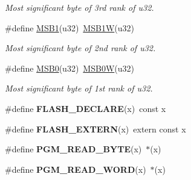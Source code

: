 \begin{DoxyCompactItemize}
\begin{DoxyCompactList}\small\item\em Most significant byte of 3rd rank of {\itshape u32}. \end{DoxyCompactList}\item 
\hypertarget{group__group__sam0__utils_ga3facab9f8ebf70ad6e16038465e2bedc}{}\#define \hyperlink{group__group__sam0__utils_ga3facab9f8ebf70ad6e16038465e2bedc}{M\+S\+B1}(u32)~\hyperlink{group__group__sam0__utils_ga0f90ecd0b0f0e15608a95b8367b77ece}{M\+S\+B1\+W}(u32)\label{group__group__sam0__utils_ga3facab9f8ebf70ad6e16038465e2bedc}

\begin{DoxyCompactList}\small\item\em Most significant byte of 2nd rank of {\itshape u32}. \end{DoxyCompactList}\item 
\hypertarget{group__group__sam0__utils_gafb81783b8186acd7182a971048b0c6b3}{}\#define \hyperlink{group__group__sam0__utils_gafb81783b8186acd7182a971048b0c6b3}{M\+S\+B0}(u32)~\hyperlink{group__group__sam0__utils_ga25110f05bdb5b5ea3fcb2854a1a07d7a}{M\+S\+B0\+W}(u32)\label{group__group__sam0__utils_gafb81783b8186acd7182a971048b0c6b3}

\begin{DoxyCompactList}\small\item\em Most significant byte of 1st rank of {\itshape u32}. \end{DoxyCompactList}\item 
\hypertarget{group__group__sam0__utils_ga9b84ecc6b34a71f797ceb8b8f7b8d384}{}\#define {\bfseries F\+L\+A\+S\+H\+\_\+\+D\+E\+C\+L\+A\+R\+E}(x)~const x\label{group__group__sam0__utils_ga9b84ecc6b34a71f797ceb8b8f7b8d384}

\item 
\hypertarget{group__group__sam0__utils_gaaef0fd990bb5bd9cdf11334f7c689fd7}{}\#define {\bfseries F\+L\+A\+S\+H\+\_\+\+E\+X\+T\+E\+R\+N}(x)~extern const x\label{group__group__sam0__utils_gaaef0fd990bb5bd9cdf11334f7c689fd7}

\item 
\hypertarget{group__group__sam0__utils_gafe9b83c73d4840986478ec67d3eb7718}{}\#define {\bfseries P\+G\+M\+\_\+\+R\+E\+A\+D\+\_\+\+B\+Y\+T\+E}(x)~$\ast$(x)\label{group__group__sam0__utils_gafe9b83c73d4840986478ec67d3eb7718}

\item 
\hypertarget{group__group__sam0__utils_ga92576bffe51090dcb6d5c67e07b9eec7}{}\#define {\bfseries P\+G\+M\+\_\+\+R\+E\+A\+D\+\_\+\+W\+O\+R\+D}(x)~$\ast$(x)\label{group__group__sam0__utils_ga92576bffe51090dcb6d5c67e07b9eec7}


\end{DoxyCompactItemize}
